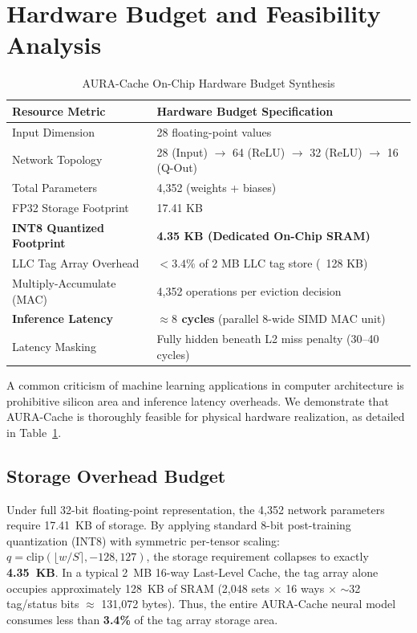 \documentclass[conference]{IEEEtran}
\begin{document}
\section{Hardware Budget and Feasibility Analysis}

\begin{table}[!t]
\centering
\caption{AURA-Cache On-Chip Hardware Budget Synthesis}
\label{tab:hw_budget}
\footnotesize
\renewcommand{\arraystretch}{0.95}
\begin{tabularx}{\columnwidth}{lX}
\toprule
\textbf{Resource Metric} & \textbf{Hardware Budget Specification} \\
\midrule
Input Dimension & 28 floating-point values \\
Network Topology & 28 (Input) $\rightarrow$ 64 (ReLU) $\rightarrow$ 32 (ReLU) $\rightarrow$ 16 (Q-Out) \\
Total Parameters & 4,352 (weights + biases) \\
FP32 Storage Footprint & 17.41 KB \\
\textbf{INT8 Quantized Footprint} & \textbf{4.35 KB (Dedicated On-Chip SRAM)} \\
LLC Tag Array Overhead & \textbf{$< 3.4\%$} of 2 MB LLC tag store (~128 KB) \\
Multiply-Accumulate (MAC) & 4,352 operations per eviction decision \\
\textbf{Inference Latency} & \textbf{$\approx 8$ cycles} (parallel 8-wide SIMD MAC unit) \\
Latency Masking & Fully hidden beneath L2 miss penalty (30--40 cycles) \\
\bottomrule
\end{tabularx}
\end{table}

A common criticism of machine learning applications in computer architecture is prohibitive silicon area and inference latency overheads. We demonstrate that AURA-Cache is thoroughly feasible for physical hardware realization, as detailed in Table~\ref{tab:hw_budget}.

\subsection{Storage Overhead Budget}
Under full 32-bit floating-point representation, the 4,352 network parameters require 17.41~KB of storage. By applying standard 8-bit post-training quantization (INT8) with symmetric per-tensor scaling: $q = \text{clip} ( \lfloor w/S \rceil, -128, 127 )$, the storage requirement collapses to exactly \textbf{4.35~KB}. In a typical 2~MB 16-way Last-Level Cache, the tag array alone occupies approximately 128~KB of SRAM (2,048 sets $\times$ 16 ways $\times$ $\sim$32 tag/status bits $\approx$ 131,072 bytes). Thus, the entire AURA-Cache neural model consumes less than \textbf{3.4\%} of the tag array storage area.
\end{document}
